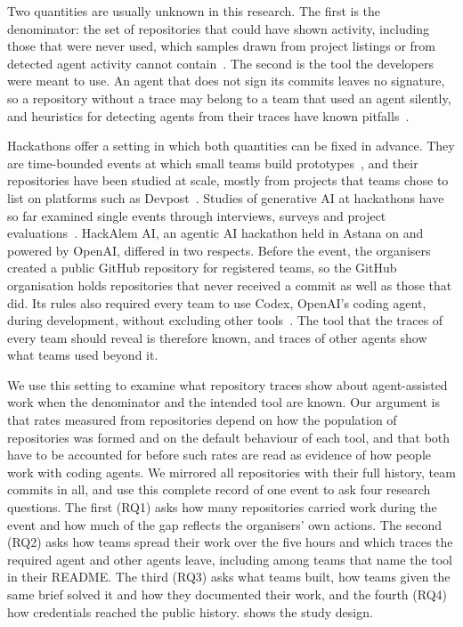 \documentclass{article}
\begin{document}
Two quantities are usually unknown in this research. The first is the denominator: the set of repositories that could have shown activity, including those that were never used, which samples drawn from project listings or from detected agent activity cannot contain~\cite{kalliamvakou2014perils,baltes2022sampling}. The second is the tool the developers were meant to use. An agent that does not sign its commits leaves no signature, so a repository without a trace may belong to a team that used an agent silently, and heuristics for detecting agents from their traces have known pitfalls~\cite{robbes2026heuristics}.

Hackathons offer a setting in which both quantities can be fixed in advance. They are time-bounded events at which small teams build prototypes~\cite{chau2023hackathons}, and their repositories have been studied at scale, mostly from projects that teams chose to list on platforms such as Devpost~\cite{imam2021secretlife,halmans2026hackrep}. Studies of generative AI at hackathons have so far examined single events through interviews, surveys and project evaluations~\cite{zhou2026quickbuild,gama2025vibes}. HackAlem AI, an agentic AI hackathon held in Astana on \eventdate{} and powered by OpenAI, differed in two respects. Before the event, the organisers created a public GitHub repository for registered teams, so the GitHub organisation holds repositories that never received a commit as well as those that did. Its rules also required every team to use Codex, OpenAI's coding agent, during development, without excluding other tools~\cite{hackalem2026site}. The tool that the traces of every team should reveal is therefore known, and traces of other agents show what teams used beyond it.

We use this setting to examine what repository traces show about agent-assisted work when the denominator and the intended tool are known. Our argument is that rates measured from repositories depend on how the population of repositories was formed and on the default behaviour of each tool, and that both have to be accounted for before such rates are read as evidence of how people work with coding agents. We mirrored all \NRqOneTotal{} repositories with their full history, \NRqTwoTeamCommitsTotal{} team commits in all, and use this complete record of one event to ask four research questions. The first (RQ1) asks how many repositories carried work during the event and how much of the gap reflects the organisers' own actions. The second (RQ2) asks how teams spread their work over the five hours and which traces the required agent and other agents leave, including among teams that name the tool in their README. The third (RQ3) asks what teams built, how teams given the same brief solved it and how they documented their work, and the fourth (RQ4) how credentials reached the public history.  shows the study design.
\end{document}
